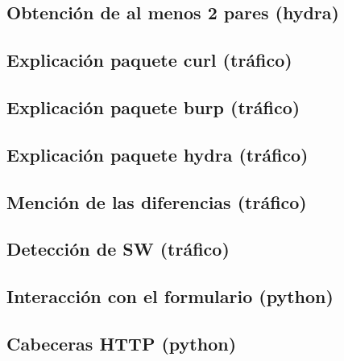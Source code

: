 \documentclass[letter,12pt]{article}
\begin{document}
\subsection{Obtención de al menos 2 pares (hydra)}

\subsection{Explicación paquete curl (tráfico)}

\subsection{Explicación paquete burp (tráfico)}

\subsection{Explicación paquete hydra (tráfico)}

\subsection{Mención de las diferencias (tráfico)}

\subsection{Detección de SW (tráfico)}

\subsection{Interacción con el formulario (python)}

\subsection{Cabeceras HTTP (python)}
\end{document}
